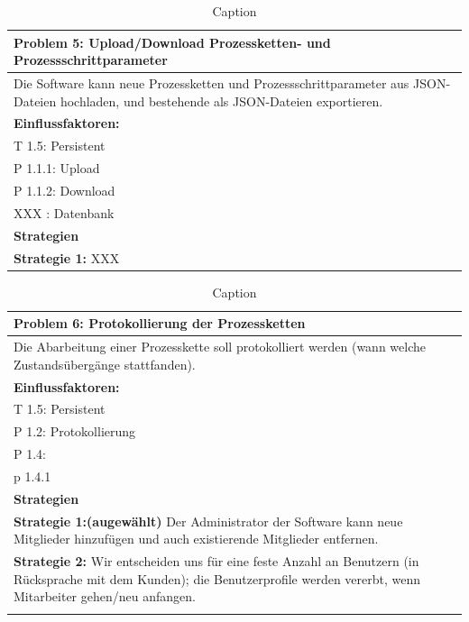 \documentclass[enabledeprecatedfontcommands,fontsize=12pt,paper=a4,twoside]{scrartcl}
\begin{document}
\begin{table}[H]
    \centering
    \begin{tabular}{|p{15cm}|}
    \hline
          \textbf{Problem 5:} Upload/Download Prozessketten- und Prozessschrittparameter \\ \hline
          Die Software kann neue Prozessketten und Prozessschrittparameter aus JSON-Dateien hochladen, und bestehende als JSON-Dateien exportieren.
          \\ \hline
          \textbf{Einflussfaktoren: } \\
          T 1.5: Persistent \\
          P 1.1.1: Upload\\
          P 1.1.2: Download\\
          XXX : Datenbank \\
          \hline
          \textbf{Strategien} \\ \hline
          \textbf{Strategie 1:} XXX
          \\ \hline
    \end{tabular}


    \caption{Caption}
    \label{tab:my_label}
\end{table}

\begin{table}[H]
    \centering
    \begin{tabular}{|p{15cm}|}
    \hline
          \textbf{Problem 6:} Protokollierung der Prozessketten
          \\ \hline
          Die Abarbeitung einer Prozesskette soll protokolliert werden (wann welche Zustandsübergänge stattfanden).
          \\ \hline
          \textbf{Einflussfaktoren: } \\
          T 1.5: Persistent \\
          P 1.2: Protokollierung\\
          P 1.4:\\
          p 1.4.1\\

          \hline
          \textbf{Strategien} \\ \hline
          \textbf{Strategie 1:(augewählt)} Der Administrator der Software kann neue Mitglieder hinzufügen und auch existierende Mitglieder entfernen. \\
	  \textbf{Strategie 2:} Wir entscheiden uns für eine feste Anzahl an Benutzern (in Rücksprache mit dem Kunden); die Benutzerprofile werden vererbt, wenn Mitarbeiter gehen/neu anfangen. \\
          \\ \hline
    \end{tabular}

    \caption{Caption}
    \label{tab:my_label}
\end{table}
\end{document}
